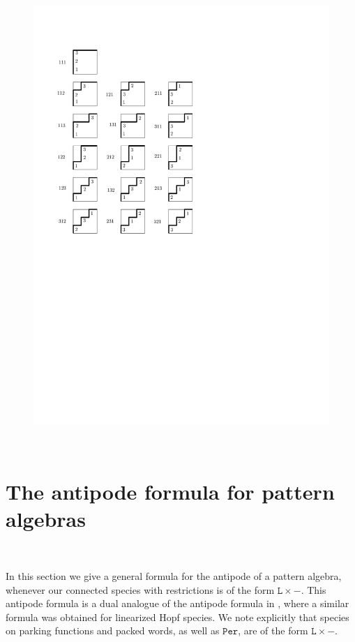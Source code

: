 \documentclass[12pt, reqno]{amsart}
\theoremstyle{definition}
\begin{document}
\begin{figure}
\centering
\includegraphics[scale=1]{../images/parking_functions_3}
\caption{\label{fig:PF3}}
\end{figure}





\

\section{The antipode formula for pattern algebras \label{sec:formula_general}}
\

In this section we give a general formula for the antipode of a pattern algebra, whenever our connected species with restrictions is of the form $\mathtt{L} \times -$. 
This antipode formula is a dual analogue of the antipode formula in \cite{BergeronBenedetti}, where a similar formula was obtained for linearized Hopf species.
We note explicitly that species on parking functions and packed words, as well as $\mathtt{Per}$, are of the form $\mathtt{L} \times -$.
\end{document}
